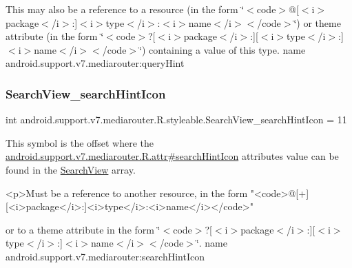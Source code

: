 This may also be a reference to a resource (in the form \char`\"{}$<$code$>$@\mbox{[}$<$i$>$package$<$/i$>$\+:\mbox{]}$<$i$>$type$<$/i$>$\+:$<$i$>$name$<$/i$>$$<$/code$>$\char`\"{}) or theme attribute (in the form \char`\"{}$<$code$>$?\mbox{[}$<$i$>$package$<$/i$>$\+:\mbox{]}\mbox{[}$<$i$>$type$<$/i$>$\+:\mbox{]}$<$i$>$name$<$/i$>$$<$/code$>$\char`\"{}) containing a value of this type.  name android.\+support.\+v7.\+mediarouter\+:query\+Hint \mbox{\label{classandroid_1_1support_1_1v7_1_1mediarouter_1_1R_1_1styleable_aee7fbb570a505fe3f44e8575152ffd62}} 
\subsubsection{\texorpdfstring{Search\+View\+\_\+search\+Hint\+Icon}{SearchView\_searchHintIcon}}
{\footnotesize\ttfamily int android.\+support.\+v7.\+mediarouter.\+R.\+styleable.\+Search\+View\+\_\+search\+Hint\+Icon = 11\hspace{0.3cm}{\ttfamily [static]}}

This symbol is the offset where the \hyperlink{classandroid_1_1support_1_1v7_1_1mediarouter_1_1R_1_1attr_a4124d3b7efb541e2235056b317ac4f4b}{android.\+support.\+v7.\+mediarouter.\+R.\+attr\#search\+Hint\+Icon} attribute\textquotesingle{}s value can be found in the \hyperlink{classandroid_1_1support_1_1v7_1_1mediarouter_1_1R_1_1styleable_a5573e3195bf93122a37c69394418c7d7}{Search\+View} array.

\begin{DoxyVerb}      <p>Must be a reference to another resource, in the form "<code>@[+][<i>package</i>:]<i>type</i>:<i>name</i></code>"
\end{DoxyVerb}
 or to a theme attribute in the form \char`\"{}$<$code$>$?\mbox{[}$<$i$>$package$<$/i$>$\+:\mbox{]}\mbox{[}$<$i$>$type$<$/i$>$\+:\mbox{]}$<$i$>$name$<$/i$>$$<$/code$>$\char`\"{}.  name android.\+support.\+v7.\+mediarouter\+:search\+Hint\+Icon \mbox{\label{classandroid_1_1support_1_1v7_1_1mediarouter_1_1R_1_1styleable_ab07321daa4d83a526ba178c813f21613}} 
